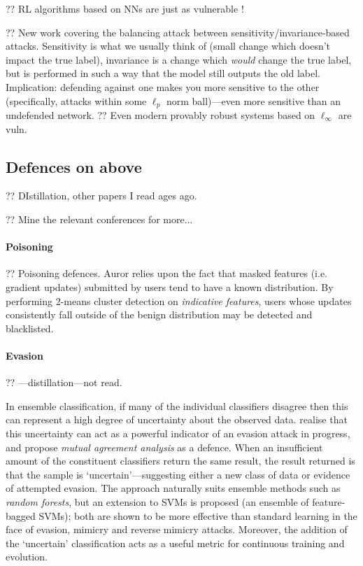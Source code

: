 ?? RL algorithms based on NNs are just as vulnerable \cite{DBLP:journals/corr/HuangPGDA17}!

?? New work \parencite{DBLP:journals/corr/abs-2002-04599} covering the balancing attack between sensitivity/invariance-based attacks. Sensitivity is what we usually think of (small change which doesn't impact the true label), invariance is a change which \emph{would} change the true label, but is performed in such a way that the model still outputs the old label. Implication: defending against one makes you more sensitive to the other (specifically, attacks within some $\ell_p$ norm ball)---even more sensitive than an undefended network.
?? Even modern provably robust systems based on $\ell_\infty$ \parencite{DBLP:conf/iclr/ZhangCXGSLBH20} are vuln.

\subsection{Defences on above}

?? DIstillation, other papers I read ages ago.

?? Mine the relevant conferences for more...

\paragraph{Poisoning}
?? Poisoning defences. Auror \cite{DBLP:conf/acsac/ShenTS16} relies upon the fact that masked features (i.e. gradient updates) submitted by users tend to have a known distribution.
By performing 2-means cluster detection on \emph{indicative features}, users whose updates consistently fall outside of the benign distribution may be detected and blacklisted.

\paragraph{Evasion}

?? \textcite{DBLP:conf/sp/PapernotM0JS16}---distillation---not read.

In ensemble classification, if many of the individual classifiers disagree then this can represent a high degree of uncertainty about the observed data.
\textcite{DBLP:conf/ndss/SmutzS16} realise that this uncertainty can act as a powerful indicator of an evasion attack in progress, and propose \emph{mutual agreement analysis} as a defence.
When an insufficient amount of the constituent classifiers return the same result, the result returned is that the sample is `uncertain'---suggesting either a new class of data or evidence of attempted evasion.
The approach naturally suits ensemble methods such as \emph{random forests}, but an extension to SVMs is proposed (an ensemble of feature-bagged SVMs); both are shown to be more effective than standard learning in the face of evasion, mimicry and reverse mimicry attacks.
Moreover, the addition of the `uncertain' classification acts as a useful metric for continuous training and evolution.

